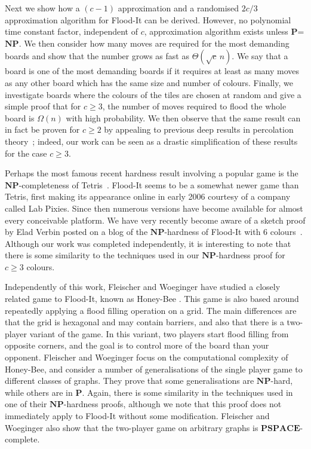 \documentclass[a4paper,11pt]{llncs}
\newcounter{l}
\renewcommand{\geq}{\geqslant}
\newcommand{\Ptime}{\ensuremath{\mathbf{P}}}
\newcommand{\NPtime}{\ensuremath{\mathbf{NP}}}
\newcommand{\PSPACE}{\ensuremath{\mathbf{PSPACE}}}
\begin{document}
 Next we show how a $(c-1)$ approximation and a randomised $2c/3$ approximation algorithm for Flood-It can be derived. However, no polynomial time constant factor, independent of $c$, approximation algorithm exists unless \Ptime=\NPtime.  We then consider how many moves are required for the most demanding boards and show that the number grows as fast as $\Theta(\sqrt{c}\, n)$. We say that a board is one of the most demanding boards if it requires at least as many moves as any other board which has the same size and number of colours. Finally, we investigate boards where the colours of the tiles are chosen at random and give a simple proof that for $c\geq 3$, the number of moves required to flood the whole board is $\Omega(n)$ with high probability. We then observe that the same result can in fact be proven for $c \geq 2$ by appealing to previous deep results in percolation theory~\cite{CW1993:random,FN1993:random}; indeed, our work can be seen as a drastic simplification of these results for the case $c \geq 3$.





\vskip 3pt
 Perhaps the most famous recent hardness result involving a popular game is the \NPtime-completeness of Tetris~\cite{DHL2003:Tetris}. Flood-It seems to be a somewhat newer game than Tetris, first making its appearance online in early 2006 courtesy of a company called Lab Pixies.  Since then numerous versions have become available for almost every conceivable platform. We have very recently become aware of a sketch proof by Elad Verbin posted on a blog of the \NPtime-hardness of Flood-It with $6$ colours~\cite{Verbinblog:2009}. Although our work was completed independently, it is interesting to note that there is some similarity to the techniques used in our \NPtime-hardness proof for $c\geq3$ colours.

Independently of this work, Fleischer and Woeginger have studied a closely related game to Flood-It, known as Honey-Bee \cite{FW2010:honey}. This game is also based around repeatedly applying a flood filling operation on a grid. The main differences are that the grid is hexagonal and may contain barriers, and also that there is a two-player variant of the game. In this variant, two players start flood filling from opposite corners, and the goal is to control more of the board than your opponent. Fleischer and Woeginger focus on the computational complexity of Honey-Bee, and consider a number of generalisations of the single player game to different classes of graphs. They prove that some generalisations are \NPtime-hard, while others are in \Ptime. Again, there is some similarity in the techniques used in one of their \NPtime-hardness proofs, although we note that this proof does not immediately apply to Flood-It without some modification. Fleischer and Woeginger also show that the two-player game on arbitrary graphs is \PSPACE-complete.
\end{document}
